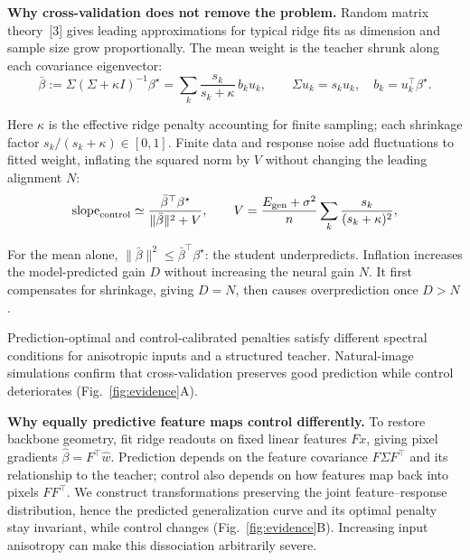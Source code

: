 \documentclass[12pt,a4paper]{article}
\newcommand{\head}[1]{\par\noindent\textbf{#1}\enspace\ignorespaces}
\newcommand{\bh}{\hat\beta}
\newcommand{\bt}{\beta^\star}
\newcommand{\mb}{\bar\beta}
\begin{document}
\head{Why cross-validation does not remove the problem.}
Random matrix theory~[3] gives leading approximations for typical ridge fits as dimension and sample size grow proportionally. The mean weight is the teacher shrunk along each covariance eigenvector:
\begin{equation}
\mb:=\Sigma(\Sigma+\kappa I)^{-1}\bt
=\sum_k\frac{s_k}{s_k+\kappa}\,b_k u_k,
\qquad \Sigma u_k=s_k u_k,\quad b_k=u_k^\top\bt.
\label{eq:mean-shrinkage}
\end{equation}
\begin{samepage}
Here $\kappa$ is the effective ridge penalty accounting for finite sampling; each shrinkage factor $s_k/(s_k+\kappa)\in[0,1]$.
Finite data and response noise add fluctuations to fitted weight, inflating the squared norm by $V$ without changing the leading alignment $N$:
\begin{equation}
\mathrm{slope}_{\rm control}\simeq
\frac{\mb^\top\bt}{\|\mb\|^2+V},
\qquad
V=\frac{E_{\rm gen}+\sigma^2}{n}
\sum_k\frac{s_k}{(s_k+\kappa)^2},
\label{eq:inflation}
\end{equation}\par
\end{samepage}
\begin{samepage}
For the mean alone, $\|\mb\|^2\le\mb^\top\bt$: the student underpredicts. Inflation increases the model-predicted gain $D$ without increasing the neural gain $N$. It first compensates for shrinkage, giving $D=N$, then causes overprediction once $D>N$.\par
\end{samepage}
\begin{samepage}
Prediction-optimal and control-calibrated penalties satisfy different spectral conditions for anisotropic inputs and a structured teacher. Natural-image simulations confirm that cross-validation preserves good prediction while control deteriorates (Fig.~\ref{fig:evidence}A).\par
\end{samepage}

\head{Why equally predictive feature maps control differently.}
To restore backbone geometry, fit ridge readouts on fixed linear features $Fx$, giving pixel gradients $\bh=F^\top\hat w$. Prediction depends on the feature covariance $F\Sigma F^\top$ and its relationship to the teacher; control also depends on how features map back into pixels $FF^\top$. We construct transformations preserving the joint feature--response distribution, hence the predicted generalization curve and its optimal penalty stay invariant, while control changes (Fig.~\ref{fig:evidence}B). Increasing input anisotropy can make this dissociation arbitrarily severe.
\end{document}
